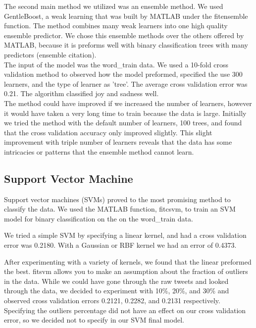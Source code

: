 \documentclass[]{article}
\begin{document}
The second main method we utilized was an ensemble method. We used GentleBoost, a weak learning that was built by MATLAB under the fitensemble function. The method combines many weak learners into one high quality ensemble predictor. We chose this ensemble methods over the others offered by MATLAB, because it is preforms well with binary classification trees with many predictors (ensemble citation). \\

The input of the model was the word\_train data. We used a 10-fold cross validation method to observed how the model preformed, specified the use 300 learners, and the type of learner as 'tree'. The average cross validation error was 0.21. The algorithm classified joy and sadness well. \\

The method could have improved if we increased the number of learners, however it would have taken a very long time to train because the data is large. Initially we tried the method with the default number of learners, 100 trees, and found that the cross validation accuracy only improved slightly. This slight improvement with triple number of learners reveals that the data has some intricacies or patterns that the ensemble method cannot learn.   


\subsection{Support Vector Machine}

Support vector machines (SVMs) proved to the most promising method to classify the data. We used the MATLAB function, fitcsvm, to train an SVM model for binary classification on the on the word\_train data.

We tried a simple SVM by specifying a linear kernel, and had a  cross validation error was 0.2180. With a Gaussian or RBF kernel we had an error of 0.4373. 


After experimenting with a variety of kernels, we found that the linear preformed the best. fitsvm allows you to make an assumption about the fraction of outliers in the data. While we could have gone through the raw tweets and looked through the data, we decided to experiment with  10\%, 20\%, and 30\% and observed cross validation errors 0.2121, 0.2282, and 0.2131 respectively. Specifying the outliers percentage did not have an effect on our cross validation error, so we decided not to specify in our SVM final model. 
\end{document}
